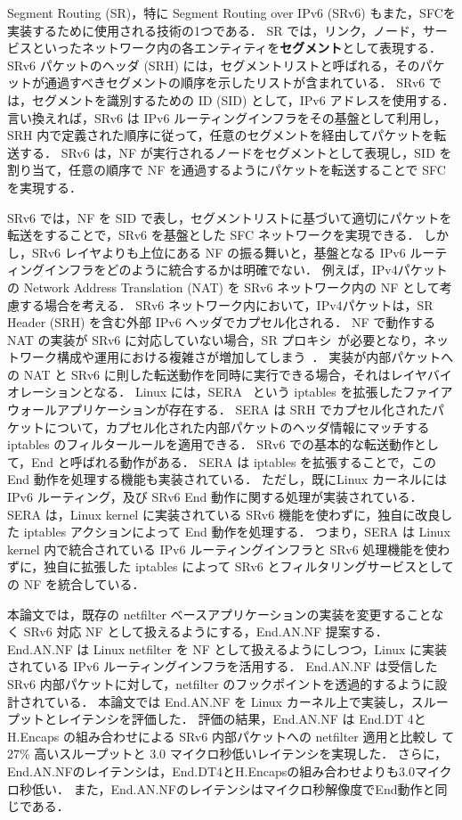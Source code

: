 Segment Routing (SR)，特に Segment Routing over IPv6 (SRv6) もまた，SFCを実装するために使用される技術の1つである．
SR では，リンク，ノード，サービスといったネットワーク内の各エンティティを\textbf{セグメント}として表現する．
SRv6 パケットのヘッダ (SRH) には，セグメントリストと呼ばれる，そのパケットが通過すべきセグメントの順序を示したリストが含まれている．
SRv6 では，セグメントを識別するための ID (SID) として，IPv6 アドレスを使用する．
言い換えれば，SRv6 は IPv6 ルーティングインフラをその基盤として利用し，SRH 内で定義された順序に従って，任意のセグメントを経由してパケットを転送する．
SRv6 は，NF が実行されるノードをセグメントとして表現し，SID を割り当て，任意の順序で NF を通過するようにパケットを転送することで SFC を実現する．

SRv6 では，NF を SID で表し，セグメントリストに基づいて適切にパケットを転送をすることで，SRv6 を基盤とした SFC ネットワークを実現できる．
しかし，SRv6 レイヤよりも上位にある NF の振る舞いと，基盤となる IPv6 ルーティングインフラをどのように統合するかは明確でない．
例えば，IPv4パケットの Network Address Translation (NAT) を SRv6 ネットワーク内の NF として考慮する場合を考える．
SRv6 ネットワーク内において，IPv4パケットは，SR Header (SRH) を含む外部 IPv6 ヘッダでカプセル化される．
NF で動作する NAT の実装が SRv6 に対応していない場合，SR プロキシ~\cite{ietf-spring-sr-service-programming-08}が必要となり，ネットワーク構成や運用における複雑さが増加してしまう~\cite{draft-scexp}．
実装が内部パケットへの NAT と SRv6 に則した転送動作を同時に実行できる場合，それはレイヤバイオレーションとなる． 
Linux には，SERA~\cite{sera} という iptables を拡張したファイアウォールアプリケーションが存在する．
SERA は SRH でカプセル化されたパケットについて，カプセル化された内部パケットのヘッダ情報にマッチする iptables のフィルタールールを適用できる．
SRv6 での基本的な転送動作として，End と呼ばれる動作がある．
SERA は iptables を拡張することで，この End 動作を処理する機能も実装されている．
ただし，既にLinux カーネルには IPv6 ルーティング，及び SRv6 End 動作に関する処理が実装されている．
SERA は，Linux kernel に実装されている SRv6 機能を使わずに，独自に改良した iptables アクションによって End 動作を処理する．
つまり，SERA は Linux kernel 内で統合されている IPv6 ルーティングインフラと SRv6 処理機能を使わずに，独自に拡張した iptables によって SRv6 とフィルタリングサービスとしての NF を統合している．

本論文では，既存の netfilter ベースアプリケーションの実装を変更することなく SRv6 対応 NF として扱えるようにする，End.AN.NF 提案する．
End.AN.NF は Linux netfilter を NF として扱えるようにしつつ，Linux に実装されている IPv6 ルーティングインフラを活用する．
End.AN.NF は受信した SRv6 内部パケットに対して，netfilter のフックポイントを透過的するように設計されている．
本論文では End.AN.NF を Linux カーネル上で実装し，スループットとレイテンシを評価した．
評価の結果，End.AN.NF は End.DT 4と H.Encaps の組み合わせによる SRv6 内部パケットへの netfilter 適用と比較し て27\% 高いスループットと 3.0 マイクロ秒低いレイテンシを実現した．
さらに，End.AN.NFのレイテンシは，End.DT4とH.Encapsの組み合わせよりも3.0マイクロ秒低い．
また，End.AN.NFのレイテンシはマイクロ秒解像度でEnd動作と同じである．

